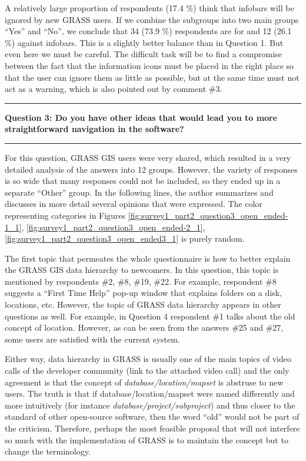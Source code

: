 \documentclass[a4paper,10pt,twoside]{article}
\begin{document}
\noindent A relatively large proportion of respondents (17.4 \%) think
that infobars will be ignored by new GRASS users. If we combine the
subgroups into two main groups ``Yes'' and ``No'', we conclude that 34
(73.9 \%) respondents are for and 12 (26.1 \%) against infobars. This
is a slightly better balance than in Question 1. But even here we must
be careful. The difficult task will be to find a compromise between
the fact that the information icons must be placed in the right place
so that the user can ignore them as little as possible, but at the
same time must not act as a warning, which is also pointed out by
comment \#3.

\par\noindent\rule{\textwidth}{0.4pt}
\noindent \textbf{Question 3: Do you have other ideas that would lead you to more straightforward navigation in the software?}
\par\noindent\rule{\textwidth}{0.4pt}
\noindent For this question, GRASS GIS users were very shared, which
resulted in a very detailed analysis of the answers into 12
groups. However, the variety of responses is so wide that many
responses could not be included, so they ended up in a separate
``Other'' group. In the following lines, the author summarizes and
discusses in more detail several opinions that were expressed. The
color representing categories in Figures
\ref{fig:survey1_part2_question3_open_ended-1_1},
\ref{fig:survey1_part2_question3_open_ended-2_1},
\ref{fig:survey1_part2_question3_open_ended3_1} is purely random.

The first topic that permeates the whole questionnaire is how to
better explain the GRASS GIS data hierarchy to newcomers. In this
question, this topic is mentioned by respondents \#2, \#8, \#19,
\#22. For example, respondent \#8 suggests a ``First Time Help''
pop-up window that explains folders on a disk, locations,
etc. However, the topic of GRASS data hierarchy appears in other
questions as well. For example, in Question 4 respondent \#1 talks
about the old concept of location. However, as can be seen from the
answers \#25 and \#27, some users are satisfied with the current
system.

Either way, data hierarchy in GRASS is usually one of the main topics
of video calls of the developer community (link to the attached video
call) and the only agreement is that the concept of
\textit{database/location/mapset} is abstruse to new users. The truth
is that if database/location/mapset were named differently and more
intuitively (for instance \textit{database/project/subproject}) and
thus closer to the standard of other open-source software, then the
word ``old'' would not be part of the criticism. Therefore, perhaps
the most feasible proposal that will not interfere so much with the
implementation of GRASS is to maintain the concept but to change the
terminology.
\end{document}
